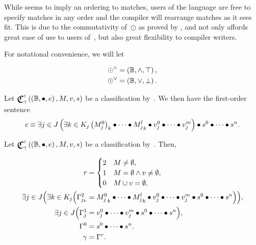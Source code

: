 While  seems to imply an ordering to matches,
  users of the language are free to specify matches in any order
    and the compiler will rearrange matches as it sees fit.
This is due to the commutativity of~$\odot$ as proved by
  ,
    and not only affords great ease of use to users of~\tame{},
      but also great flexibility to compiler writers.

For notational convenience,
  we will let

\begin{align}
  \odot^\land &= \left({\mathbb{B}},{\land},{\top}\right), \\
  \odot^\lor &= \left({\mathbb{B}},{\lor},{\bot}\right).
\end{align}


\def\cpredmatseq{{M^0_j}_k \bullet\cdots\bullet {M^l_j}_k}
\def\cpredvecseq{v^0_j\bullet\cdots\bullet v^m_j}
\def\cpredscalarseq{s^0\bullet\cdots\bullet s^n}


\begin{axiom}
  Let $\Classify^c_\gamma\left(\Monoid\Bool\bullet e,M,v,s\right)$ be a
    classification by~.
  We then have the first-order sentence
  \begin{equation*}
    c \equiv
      {} \Exists{j\in J}{\Exists{k\in K_j}\cpredmatseq\bullet\cpredvecseq}
        \bullet\cpredscalarseq.
  \end{equation*}
\end{axiom}


\begin{axiom}
  Let $\Classify^c_\gamma\left(\Monoid\Bool\bullet e,M,v,s\right)$ be a
    classification by~.
  Then,

  \begin{align}
    r &= \begin{cases}
           2 &M\neq\emptyset, \\
           1 &M=\emptyset \land v\neq\emptyset, \\
           0 &M\union v = \emptyset,
         \end{cases} \\
    \exists{j\in J}\Big(\exists{k\in K_j}\Big(
      \Gamma^2_{j_k} &= \cpredmatseq\bullet\cpredvecseq\bullet\cpredscalarseq
    \Big)\Big), \\
    \exists{j\in J}\Big(
      \Gamma^1_j &= \cpredvecseq\bullet\cpredscalarseq
    \Big), \\
    \Gamma^0 &= \cpredscalarseq. \\
    \gamma &= \Gamma^r.
  \end{align}
\end{axiom}

